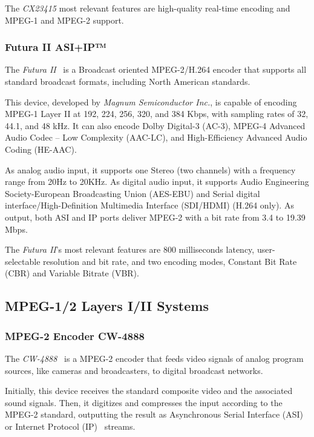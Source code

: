 The \textit{CX23415} most relevant features are high-quality real-time encoding and MPEG-1 and MPEG-2 support.

\subsubsection{Futura II ASI+IP™}

The \textit{Futura II}~\cite{futura} is a Broadcast oriented MPEG-2/H.264 encoder that supports all standard broadcast formats, including North American standards. 

This device, developed by \textit{Magnum Semiconductor Inc.}, is capable of encoding MPEG-1 Layer II at 192, 224, 256, 320, and 384 Kbps, with sampling rates of 32, 44.1, and 48 kHz. It can also encode Dolby Digital-3 (AC-3), MPEG-4 Advanced Audio Codec – Low Complexity (AAC-LC), and High-Efficiency Advanced Audio Coding (HE-AAC).

As analog audio input, it supports one Stereo (two channels) with a frequency range from 20Hz to 20KHz. As digital audio input, it supports Audio Engineering Society-European Broadcasting Union (AES-EBU) and Serial digital interface/High-Definition Multimedia Interface (SDI/HDMI) (H.264 only).
As output, both ASI and IP ports deliver MPEG-2 with a bit rate from 3.4 to 19.39 Mbps.

The \textit{Futura II}'s most relevant features are 800 milliseconds latency, user-selectable resolution and bit rate, and two encoding modes, Constant Bit Rate (CBR) and Variable Bitrate (VBR).

\subsection{MPEG-1/2 Layers I/II Systems}

\subsubsection{MPEG-2 Encoder CW-4888}

The \textit{CW-4888}~\cite{cw4888} is a MPEG-2 encoder that feeds video signals of analog program sources, like cameras and broadcasters, to digital broadcast networks.

Initially, this device receives the standard composite video and the associated sound signals. Then, it digitizes and compresses the input according to the MPEG-2 standard, outputting the result as Asynchronous Serial Interface (ASI)~\cite{asi} or Internet Protocol (IP)~\cite{ip} streams.

